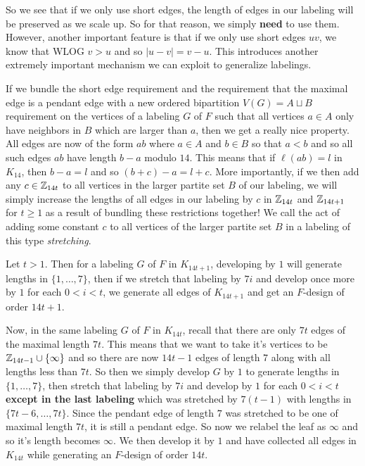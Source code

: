   So we see that if we only use short edges, the length of edges in our labeling will be preserved as we scale up. So for that reason, we simply \textbf{need} to use them. However, another important feature is that if we only use short edges $uv$, we know that WLOG $v>u$ and so $|u-v|=v-u$. This introduces another extremely important mechanism we can exploit to generalize labelings.

  If we bundle the short edge requirement and the requirement that the maximal edge is a pendant edge with a new ordered bipartition $V(G)=A\sqcup B$ requirement on the vertices of a labeling $G$ of $F$ such that all vertices $a\in A$ only have neighbors in $B$ which are larger than $a$, then we get a really nice property. All edges are now of the form $ab$ where $a\in A$ and $b\in B$ so that $a<b$ and so all such edges $ab$ have length $b-a$ modulo $14$. This means that if $\ell(ab)=l$ in $K_{14}$, then $b-a=l$ and so $(b+c)-a=l+c$. More importantly, if we then add any $c\in \mathbb{Z}_{14t}$ to all vertices in the larger partite set $B$ of our labeling, we will simply increase the lengths of all edges in our labeling by $c$ in $\mathbb{Z}_{14t}$ and $\mathbb{Z}_{14t+1}$ for $t\geq 1$ as a result of bundling these restrictions together! We call the act of adding some constant $c$ to all vertices of the larger partite set $B$ in a labeling of this type \textit{stretching}.

  Let $t>1$. Then for a labeling $G$ of $F$ in $K_{14t+1}$, developing by $1$ will generate lengths in $\{1,\hdots,7\}$, then if we stretch that labeling by $7i$ and develop once more by $1$ for each $0<i<t$, we generate all edges of $K_{14t+1}$ and get an $F$-design of order $14t+1$. 
  
  Now, in the same labeling $G$ of $F$ in $K_{14t}$, recall that there are only $7t$ edges of the maximal length $7t$. This means that we want to take it's vertices to be $\mathbb{Z}_{14t-1}\cup \{\infty\}$ and so there are now $14t-1$ edges of length $7$ along with all lengths less than $7t$. So then we simply develop $G$ by $1$ to generate lengths in $\{1,\hdots,7\}$, then stretch that labeling by $7i$ and develop by $1$ for each $0<i<t$ \textbf{except in the last labeling} which was stretched by $7(t-1)$ with lengths in $\{7t-6,\hdots,7t\}$. Since the pendant edge of length $7$ was stretched to be one of maximal length $7t$, it is still a pendant edge. So now we relabel the leaf as $\infty$ and so it's length becomes $\infty$. We then develop it by $1$ and have collected all edges in $K_{14t}$ while generating an $F$-design of order $14t$.

